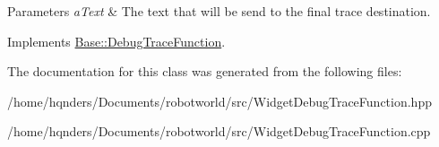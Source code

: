 \begin{DoxyParams}{Parameters}
{\em a\+Text} & The text that will be send to the final trace destination. \\
\hline
\end{DoxyParams}


Implements \hyperlink{class_base_1_1_debug_trace_function_a54f5a1f127e7624e50bb1a43146f8998}{Base\+::\+Debug\+Trace\+Function}.



The documentation for this class was generated from the following files\+:\begin{DoxyCompactItemize}
\item 
/home/hqnders/\+Documents/robotworld/src/Widget\+Debug\+Trace\+Function.\+hpp\item 
/home/hqnders/\+Documents/robotworld/src/Widget\+Debug\+Trace\+Function.\+cpp\end{DoxyCompactItemize}
